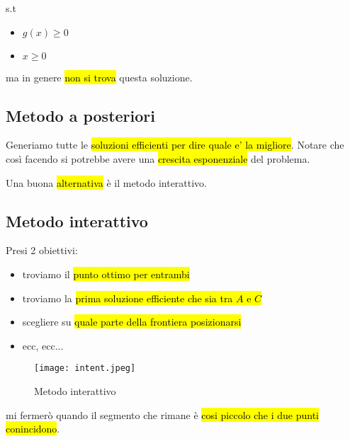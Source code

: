 s.t
\begin{itemize}
    \item $g(x) \geq 0$
    \item $x \geq 0$
\end{itemize}

ma in genere \hl{non si trova} questa soluzione.


\subsection{Metodo a posteriori}

Generiamo tutte le \hl{soluzioni efficienti per dire quale e' la migliore}. Notare che così facendo si potrebbe avere una \hl{crescita esponenziale} del problema.

Una buona \hl{alternativa} è il metodo interattivo.


\subsection{Metodo interattivo}

Presi 2 obiettivi:

\begin{itemize}
    \item troviamo il \hl{punto ottimo per entrambi}
    \item troviamo la \hl{prima soluzione efficiente che sia tra $A$ e $C$}
    \item scegliere su \hl{quale parte della frontiera posizionarsi}
    \item ecc, ecc...
\end{itemize}

\begin{figure}[H]
\centering
\texttt{[image: intent.jpeg]}
\caption{Metodo interattivo} 
\label{intent}
\end{figure}

mi fermerò quando il segmento che rimane è \hl{cosi piccolo che i due punti conincidono}.